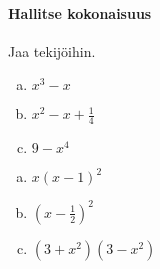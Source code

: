 \paragraph*{Hallitse kokonaisuus}

\begin{tehtava}
    Jaa tekijöihin.
    \begin{enumerate}[a)]
    	\item $x^3 - x$
        \item $x^2 - x + \frac{1}{4} $
        \item $9-x^4$
    \end{enumerate}
    \begin{vastaus}
        \begin{enumerate}[a)]
            \item $x(x-1)^2$
            \item $(x-\frac{1}{2})^2$
            \item $(3+x^2)(3-x^2)$
        \end{enumerate}
    \end{vastaus}
\end{tehtava}
